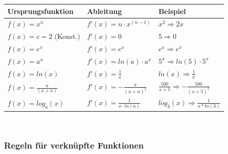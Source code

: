 \documentclass[12pt]{scrartcl}
\begin{document}
\renewcommand{\arraystretch}{1.5}
\begin{center}
    \begin{tabular}{ | m{10em} | m{10em} | m{10em} | }
        \hline
        Ursprungsfunktion & Ableitung & Beispiel \\ 
        \hline
        $f(x) = x^n$ & $f'(x) = n \cdot x^{(n-1)} $ & $x^2 \Rightarrow 2x$\\ 
        \hline
        $f(x) = c = 2$ (Konst.) & $f'(x) = 0$ & $5 \Rightarrow 0$ \\
        \hline
        $f(x) = e^x$ & $f'(x) = e^x$ & $e^x \Rightarrow e^x$ \\
        \hline
        $f(x) = a^x$ & $f'(x) = ln(a) \cdot a^x$ & $5^x \Rightarrow ln(5) \cdot 5^x$ \\
        \hline
        $f(x) = ln(x)$ & $f'(x) = \frac{1}{x}$ & $ln(x) \Rightarrow \frac{1}{x}$ \\
        \hline 
        $f(x) = \frac{a}{(x + n)} $ & $ f'(x) = -\frac{a}{(x+n)^2} $ & $\frac{500}{x + 5} \Rightarrow -\frac{500}{(x+5)^2}$\\
        \hline 
        $f(x) = log_a(x) $ & $f'(x) = \frac{1}{x \cdot ln(a)}$ & $log_3(x) \Rightarrow \frac{1}{x * ln(3)}$ \\
        \hline 

    \end{tabular}
\end{center}

\hspace{0pt} \\

\subsubsection{Regeln für verknüpfte Funktionen}
\end{document}
